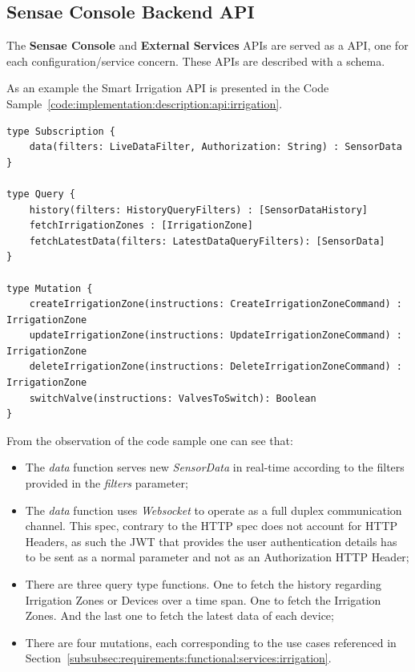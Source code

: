 \subsection{Sensae Console Backend API}
\label{subsec:implementation:description:api}

The \textbf{Sensae Console} and \textbf{External Services} \gls{API}s are served as a  \gls{API}, one for each configuration/service concern. These \gls{API}s are described with a schema.

As an example the Smart Irrigation \gls{API} is presented in the Code Sample~\ref{code:implementation:description:api:irrigation}.

\begin{lstlisting}[caption=Smart Irrigation API Schema, label={code:implementation:description:api:irrigation}]
type Subscription {
    data(filters: LiveDataFilter, Authorization: String) : SensorData
}

type Query {
    history(filters: HistoryQueryFilters) : [SensorDataHistory]
    fetchIrrigationZones : [IrrigationZone]
    fetchLatestData(filters: LatestDataQueryFilters): [SensorData]
}

type Mutation {
    createIrrigationZone(instructions: CreateIrrigationZoneCommand) : IrrigationZone
    updateIrrigationZone(instructions: UpdateIrrigationZoneCommand) : IrrigationZone
    deleteIrrigationZone(instructions: DeleteIrrigationZoneCommand) : IrrigationZone
    switchValve(instructions: ValvesToSwitch): Boolean
}
\end{lstlisting}

From the observation of the code sample one can see that:

\begin{itemize}
    \item The \textit{data} function serves new \textit{SensorData} in real-time according to the filters provided in the \textit{filters} parameter;
    \item The \textit{data} function uses \textit{Websocket} to operate as a full duplex communication channel. This spec, contrary to the HTTP spec does not account for HTTP Headers, as such the \gls{JWT} that provides the user authentication details has to be sent as a normal parameter and not as an Authorization HTTP Header;
    \item  There are three query type functions. One to fetch the history regarding Irrigation Zones or Devices over a time span. One to fetch the Irrigation Zones. And the last one to fetch the latest data of each device;
    \item There are four mutations, each corresponding to the use cases referenced in Section~\ref{subsubsec:requirements:functional:services:irrigation}.
\end{itemize}

